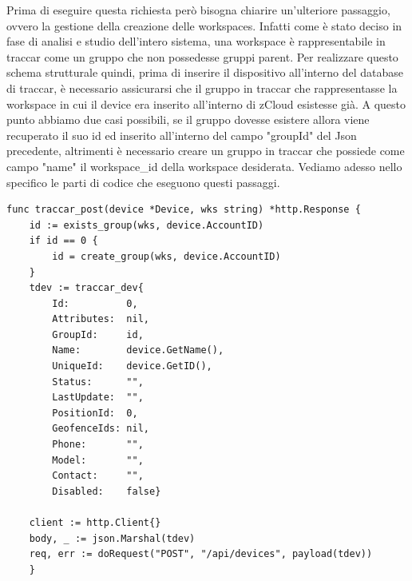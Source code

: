 \documentclass[a4paper,titlepage,12pt]{book}
\begin{document}
{\noindent Prima di eseguire questa richiesta però bisogna chiarire un'ulteriore passaggio, ovvero la gestione della creazione delle workspaces. Infatti come è stato deciso in fase di analisi e studio dell'intero sistema, una workspace è rappresentabile in traccar come un gruppo che non possedesse gruppi parent. Per realizzare questo schema strutturale quindi, prima di inserire il dispositivo all'interno del database di traccar, è necessario assicurarsi che il gruppo in traccar che rappresentasse la workspace in cui il device era inserito all'interno di zCloud esistesse già. A questo punto abbiamo due casi possibili, se il gruppo dovesse esistere allora viene recuperato il suo id ed inserito all'interno del campo "groupId" del Json precedente, altrimenti è necessario creare un gruppo in traccar che possiede come campo "name" il workspace\_id della workspace desiderata. Vediamo adesso nello specifico le parti di codice che eseguono questi passaggi.\\

\begin{verbatim}
func traccar_post(device *Device, wks string) *http.Response {
	id := exists_group(wks, device.AccountID)
	if id == 0 {
		id = create_group(wks, device.AccountID)
	}
    tdev := traccar_dev{
		Id:          0,
		Attributes:  nil,
		GroupId:     id,
		Name:        device.GetName(),
		UniqueId:    device.GetID(),
		Status:      "",
		LastUpdate:  "",
		PositionId:  0,
		GeofenceIds: nil,
		Phone:       "",
		Model:       "",
		Contact:     "",
		Disabled:    false}

	client := http.Client{}
	body, _ := json.Marshal(tdev)
	req, err := doRequest("POST", "/api/devices", payload(tdev))
	}
\end{verbatim}

}
\end{document}
